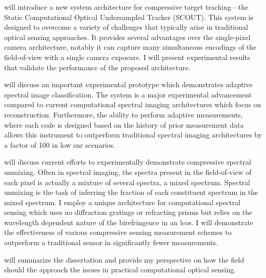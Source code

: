  will introduce a new system architecture for compressive target tracking---the Static Computational Optical Undersampled Tracker (SCOUT). This system is designed to overcome a variety of challenges that typically arise in traditional optical sensing approaches. It provides several advantages over the single-pixel camera architecture, notably it can capture many simultaneous encodings of the field-of-view with a single camera exposure. I will present experimental results that validate the performance of the proposed architecture. 

 will discuss an important experimental prototype which demonstrates adaptive spectral image classification. The system is a major experimental advancement compared to current computational spectral imaging architectures which focus on reconstruction. Furthermore, the ability to perform adaptive measurements, where each code is designed based on the history of prior measurement data allows this instrument to outperform traditional spectral imaging architectures by a factor of 100 in low \gls{snr} scenarios.

 will discuss current efforts to experimentally demonstrate compressive spectral unmixing. Often in spectral imaging, the spectra present in the field-of-view of each pixel is actually a mixture of several spectra, a mixed spectrum. Spectral unmixing is the task of inferring the fraction of each constituent spectrum in the mixed spectrum. I employ a unique architecture for computational spectral sensing which uses no diffraction gratings or refracting prisms but relies on the wavelength dependent nature of the birefringence in an \gls{lcos}. I will demonstrate the effectiveness of various compressive sensing measurement schemes to outperform a traditional sensor in significantly fewer measurements. 

 will summarize the dissertation and provide my perspective on how the field should the approach the issues in practical computational optical sensing.


%  
%

